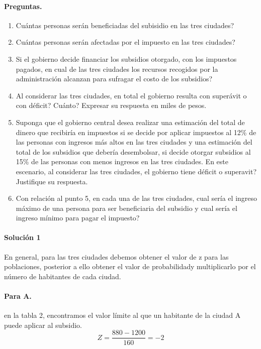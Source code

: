 \documentclass{article}
\begin{document}
\paragraph{Preguntas.}

\begin{enumerate}
	\item Cuántas personas serán beneficiadas del subisidio en las tres ciudades?
	\item Cuántas personas serán afectadas por el impuesto en las tres ciudades?
	\item Si el gobierno decide financiar los subsidios otorgado, con los impuestos pagados, en cual de las tres ciudades los recursos recogidos por la administración alcanzan para sufragar el costo de los subsidios?
	\item Al considerar las tres ciudades, en total el gobierno resulta con superávit o con déficit? Cuánto? Expresar su respuesta en miles de pesos.
	\item Suponga que el gobierno central desea realizar una estimación del total de dinero que recibiría en impuestos si se decide por aplicar impuestos al 12\% de las personas con ingresos más altos en las tres ciudades y una estimación del total de los subsidios que debería desembolsar, si decide otorgar subsidios al 15\% de las personas con menos ingresos en las tres ciudades. En este escenario, al considerar las tres ciudades, el gobierno tiene déficit o superavit? Justifique su respuesta.
	\item Con relación al punto 5, en cada una de las tres ciudades, cual sería el ingreso máximo de una persona para ser beneficiaria del subsidio y cual sería el ingreso mínimo para pagar el impuesto?
\end{enumerate}

\paragraph{Solución 1} En general, para las tres ciudades debemos obtener el valor de z para las poblaciones, posterior a ello obtener el valor de probabilidady multiplicarlo por el número de habitantes de cada ciudad.

\paragraph{Para A.} en la tabla 2, encontramos el valor límite al que un habitante de la ciudad A puede aplicar al subsidio.
$$Z = \frac{880 - 1200}{160} = -2 $$
\end{document}
